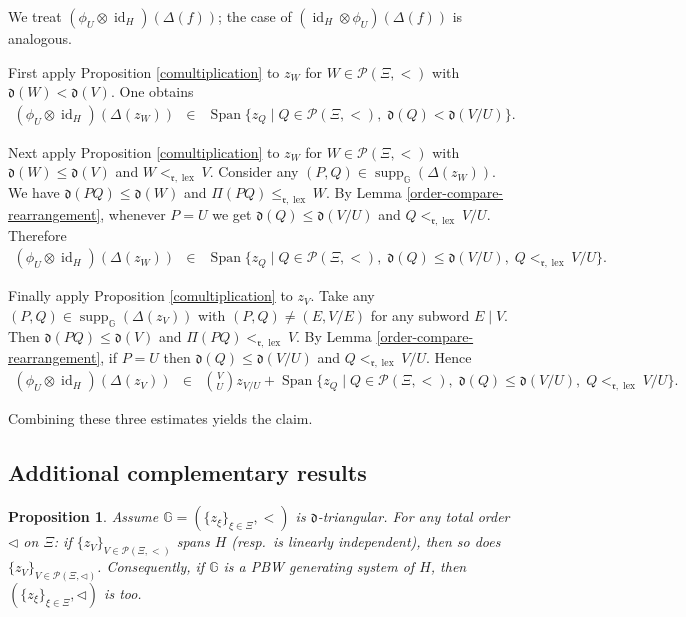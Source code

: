 \documentclass{article}
\makeatletter
\renewenvironment{proof}[1][\proofname]{\par
	\pushQED{\qed}%
	\normalfont \topsep6\p@\@plus6\p@\relax
	\trivlist
	\item[\hskip\labelsep
	\bfseries
	#1\@addpunct{.}]\ignorespaces
}{%
	\popQED\endtrivlist\@endpefalse
}
\theoremstyle{plain}
\newtheorem{prop}[thm]{Proposition}
\theoremstyle{definition}
\numberwithin{equation}{section}
\DeclareMathOperator{\id}{id}
\DeclareMathOperator{\Span}{Span}
\DeclareMathOperator{\lex}{lex}
\DeclareMathOperator{\supp}{supp}
\newcommand{\PP}{\mathcal{P}}
\newcommand{\GG}{\mathbb{G}}
\newcommand{\dd}{\mathfrak{d}}
\newcommand{\rr}{\mathfrak{r}}
\makeatother
\begin{document}
	\begin{proof}
		We treat $(\phi_{U}\otimes \id_{H})(\Delta(f))$; the case of $(\id_{H}\otimes \phi_{U}) (\Delta(f))$ is analogous.
		
		First apply Proposition \ref{comultiplication} to $z_{W}$ for $W\in \PP(\Xi, <)$ with $\dd(W) <\dd(V)$. One obtains
		\begin{eqnarray*}
			(\phi_{U}\otimes \id_{H}) (\Delta(z_{W})) &\in & \Span\{z_{Q}\mid Q\in \PP(\Xi,<),\; \dd(Q) < \dd(V/U) \}.
		\end{eqnarray*}
		
		Next apply Proposition \ref{comultiplication} to $z_{W}$ for $W \in \PP(\Xi, <)$ with $\dd(W) \leq \dd(V)$ and $W <_{\rr,\lex} V$. Consider any $(P,Q) \in \supp_{\GG} (\Delta(z_{W}))$. We have $\dd(PQ) \leq \dd(W)$ and $\Pi(PQ) \leq _{\rr,\lex} W$. By Lemma \ref{order-compare-rearrangement}, whenever $P=U$ we get $\dd(Q) \leq \dd(V/U)$ and $Q <_{\rr,\lex} V/U$. Therefore
		\begin{eqnarray*}
			(\phi_{U}\otimes \id_{H}) (\Delta(z_{W})) &\in & \Span\{z_{Q}\mid Q\in \PP(\Xi,<),\; \dd(Q) \leq  \dd(V/U),\; Q <_{\rr,\lex} V/U \}.
		\end{eqnarray*}
		
		Finally apply Proposition \ref{comultiplication} to $z_{V}$. Take any $(P,Q) \in \supp_{\GG} (\Delta(z_{V}))$ with $(P,Q) \neq (E, V/E)$ for any subword $E\mid V$. Then $\dd(PQ) \leq \dd(V)$ and $\Pi(PQ) <_{\rr,\lex} V$. By Lemma \ref{order-compare-rearrangement}, if $P=U$ then $\dd(Q) \leq \dd(V/U)$ and $Q <_{\rr,\lex} V/U$. Hence
		\begin{eqnarray*}
			(\phi_{U}\otimes \id_{H})(\Delta(z_{V})) &\in& \binom{V}{U} z_{V/U}  + \Span\{z_{Q}\mid Q\in \PP(\Xi,<),\; \dd(Q)\leq \dd(V/U),\; Q <_{\rr,\lex} V/U  \}.
		\end{eqnarray*}
		
		Combining these three estimates yields the claim.
	\end{proof}
	
	\subsection{Additional complementary results}
	
	\begin{prop}\label{change-of-order}
		Assume $\GG=(\{z_{\xi}\}_{\xi\in \Xi}, <)$ is $\dd$-triangular. For any total order $\triangleleft$ on $\Xi$: if $\{z_V\}_{V\in \PP(\Xi,<)}$ spans $H$ (resp.\ is linearly independent), then so does $\{z_V\}_{V\in \PP(\Xi,\triangleleft)}$. Consequently, if $\GG$ is a PBW generating system of $H$, then $(\{z_{\xi}\}_{\xi\in \Xi}, \triangleleft)$ is too.
	\end{prop}
	
\end{document}
